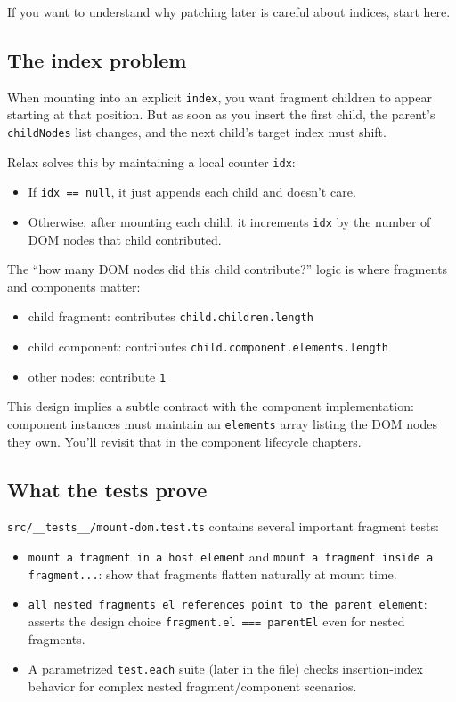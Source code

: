 If you want to understand why patching later is careful about indices, start here.

\subsection{The index problem}
When mounting into an explicit \texttt{index}, you want fragment children to appear starting at that position.
But as soon as you insert the first child, the parent's \texttt{childNodes} list changes, and the next child's target index must shift.

Relax solves this by maintaining a local counter \texttt{idx}:

\begin{itemize}
  \item If \texttt{idx == null}, it just appends each child and doesn't care.
  \item Otherwise, after mounting each child, it increments \texttt{idx} by the number of DOM nodes that child contributed.
\end{itemize}

The ``how many DOM nodes did this child contribute?'' logic is where fragments and components matter:

\begin{itemize}
  \item child fragment: contributes \texttt{child.children.length}
  \item child component: contributes \texttt{child.component.elements.length}
  \item other nodes: contribute \texttt{1}
\end{itemize}

This design implies a subtle contract with the component implementation: component instances must maintain an \texttt{elements} array listing the DOM nodes they own.
You'll revisit that in the component lifecycle chapters.

\subsection*{What the tests prove}
  	\texttt{src/\_\_tests\_\_/mount-dom.test.ts} contains several important fragment tests:

\begin{itemize}
  \item \texttt{mount a fragment in a host element} and \texttt{mount a fragment inside a fragment...}: show that fragments flatten naturally at mount time.
  \item \texttt{all nested fragments el references point to the parent element}: asserts the design choice \texttt{fragment.el === parentEl} even for nested fragments.
  \item A parametrized \texttt{test.each} suite (later in the file) checks insertion-index behavior for complex nested fragment/component scenarios.
\end{itemize}

